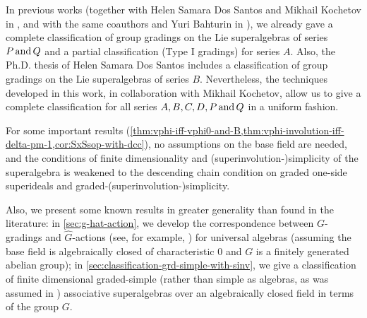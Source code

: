 \begin{prefatory}
\noindent
In previous works (together with Helen Samara Dos Santos and Mikhail Kochetov in \cite{paper-MAP}, and with the same coauthors and Yuri Bahturin in \cite{paper-Qn}), we already gave a complete classification of group gradings on the Lie superalgebras of series $P \,\text{and}\, Q$ and a partial classification (Type I gradings) for series $A$. 
Also, the Ph.D. thesis \cite{Helens_thesis} of Helen Samara Dos Santos includes a classification of group gradings on the Lie superalgebras of series $B$. 
Nevertheless, the techniques developed in this work, in collaboration with Mikhail Kochetov, allow us to give a complete classification for all series  $A, B, C, D, P \,\text{and}\, Q$ in a uniform fashion. 

\noindent 
For some important results (\cref{thm:vphi-iff-vphi0-and-B,thm:vphi-involution-iff-delta-pm-1,cor:SxSsop-with-dcc}), no assumptions on the base field are needed, and the conditions of finite dimensionality and (superinvolution-)simplicity of the superalgebra is weakened to the descending chain condition on graded one-side superideals and graded-(superinvolution-)simplicity. 

\noindent
Also, we present some known results in greater generality than found in the literature: 
in \cref{sec:g-hat-action}, we develop the correspondence between $G$-gradings and $\widehat G$-actions (see, for example, \cite[Section 1.4]{livromicha}) for universal algebras (assuming the base field is algebraically closed of characteristic $0$ and $G$ is a finitely generated abelian group); 
in \cref{sec:classification-grd-simple-with-sinv}, we give a classification of finite dimensional graded-simple (rather than simple as algebras, as was assumed in \cite{paper-MAP}) associative superalgebras over an algebraically closed field in terms of the group $G$. 



\tableofcontents%
%
%
\end{prefatory}
%
